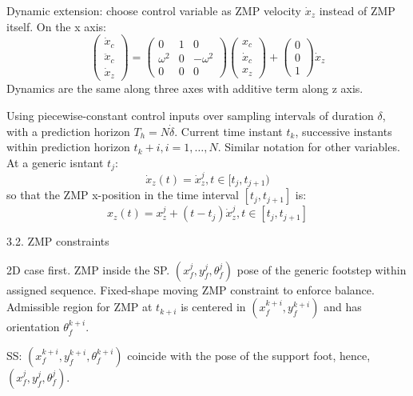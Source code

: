 Dynamic extension: choose control variable as ZMP velocity $\dot{x}_z$ instead
of ZMP itself. On the x axis:
\begin{equation}
  \begin{pmatrix}
    \dot{x}_c \\
    \ddot{x}_c \\
    \dot{x}_z
  \end{pmatrix}
  =
  \begin{pmatrix}
    0 & 1 & 0 \\
    \omega^2 & 0 & -\omega^2 \\
    0 & 0 & 0
  \end{pmatrix}
  \begin{pmatrix}
    x_c \\
    \dot{x}_c \\
    x_z
  \end{pmatrix}
  +
  \begin{pmatrix}
    0 \\
    0 \\
    1
  \end{pmatrix}
  \dot{x}_z
\end{equation}
Dynamics are the same along three axes with additive term along z axis.

Using piecewise-constant control inputs over sampling intervals of duration 
$\delta$, with a prediction horizon $T_h = N \dot \delta$. Current time instant
$t_k$, successive instants within prediction horizon $t_k+i, i = 1, \dots, N$.
Similar notation for other variables. At a generic isntant $t_j$:
\begin{equation}
  \dot{x}_z(t) = \dot{x}_z^j, t \in [t_j, t_{j+1})
\end{equation}
so that the ZMP x-position in the time interval $[t_j, t_{j+1}]$ is:
\begin{equation}
  x_z(t) = x_z^j + (t - t_j) \dot{x}_z^j, t \in [t_j, t_{j+1}]
\end{equation}

3.2. ZMP constraints

2D case first. ZMP inside the SP. $(x_f^j, y_f^j, \theta_f^j)$ pose of the 
generic footstep within assigned sequence. Fixed-shape moving ZMP constraint to
enforce balance. Admissible region for ZMP at $t_{k+i}$ is centered in 
$(x_f^{k+i}, y_f^{k+i})$ and has orientation $\theta_f^{k+i}$.

SS: $(x_f^{k+i}, y_f^{k+i}, \theta_f^{k+i})$ coincide with the pose of the 
support foot, hence, $(x_f^j, y_f^j, \theta_f^j)$.

